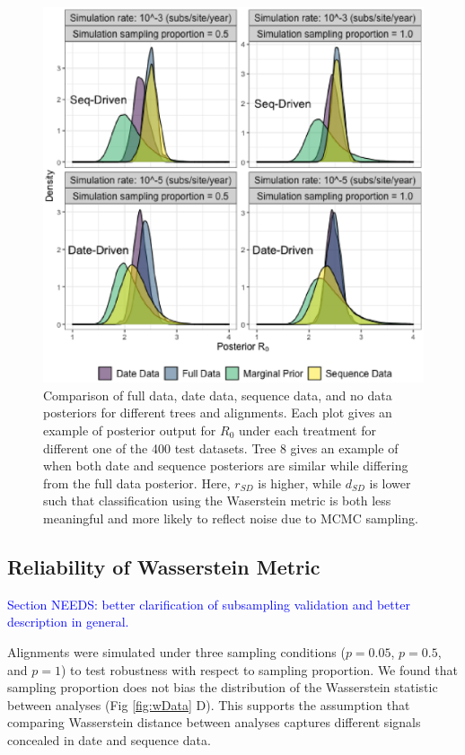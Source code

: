 \documentclass{article}
\begin{document}
\begin{figure}[H]
\centering
\includegraphics[width=1\linewidth]{figures/postEg.eps}
\caption{Comparison of full data, date data, sequence data, and no data posteriors for different trees and alignments. Each plot gives an example of posterior output for $R_0$ under each treatment for different one of the 400 test datasets. Tree 8 gives an example of when both date and sequence posteriors are similar while differing from the full data posterior. Here, $r_{SD}$ is higher, while $d_{SD}$ is lower such that classification using the Waserstein metric is both less meaningful and more likely to reflect noise due to MCMC sampling.}
\label{fig:posts}
\end{figure}
\subsection*{Reliability of Wasserstein Metric}

\textcolor{blue}{Section NEEDS: better clarification of subsampling validation and better description in general.}

Alignments were simulated under three sampling conditions ($p=0.05$, $p=0.5$, and $p=1$) to test robustness with respect to sampling proportion. We found that sampling proportion does not bias the distribution of the Wasserstein statistic between analyses (Fig \ref{fig:wData} D). This supports the assumption that comparing Wasserstein distance between analyses captures different signals concealed in date and sequence data. 
\end{document}
